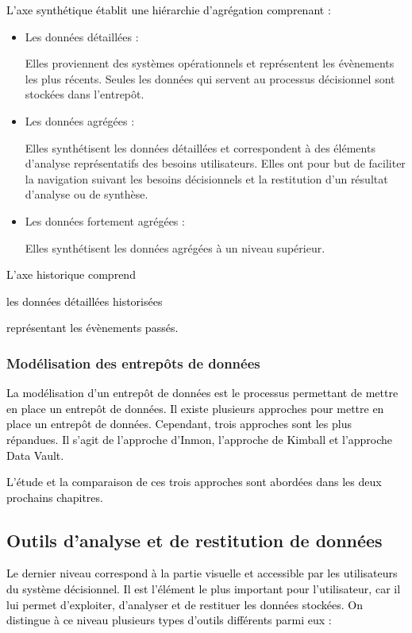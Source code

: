 \documentclass[a4paper,12pt]{report}
\begin{document}
\textcolor{black}{L’axe synthétique établit une hiérarchie d’agrégation comprenant \citep{inmon2002building} :}


\begin{itemize}
	\item  \begin{bf}Les données détaillées : \end{bf} Elles proviennent des systèmes opérationnels et représentent les évènements les plus récents. Seules les données qui servent au processus décisionnel sont stockées dans l’entrepôt.
	\item  \begin{bf}Les données agrégées : \end{bf}Elles synthétisent les données détaillées et correspondent à des éléments d’analyse représentatifs des besoins utilisateurs. Elles ont pour but de faciliter la navigation suivant les besoins décisionnels et la restitution d’un résultat d’analyse ou de synthèse.
	\item  \begin{bf}Les données fortement agrégées : \end{bf}Elles synthétisent les données agrégées à un niveau supérieur.
	\end{itemize}


\textcolor{black}{L’axe historique comprend \begin{bf} les données détaillées historisées \end{bf}représentant les évènements passés.}

\subsubsection{Modélisation des entrepôts de données}
\textcolor{black}{La modélisation d’un entrepôt de données est le processus permettant de mettre en place un entrepôt de données. Il existe plusieurs approches pour mettre en place un entrepôt de données. Cependant, trois approches sont les plus répandues. Il s’agit de l’approche d’Inmon, l’approche de Kimball et l’approche Data Vault.}

\textcolor{black}{L’étude et la comparaison de ces trois approches sont abordées dans les deux prochains chapitres.}

\subsection{Outils d’analyse et de restitution de données}
\textcolor{black}{Le dernier niveau correspond à la partie visuelle et accessible par les utilisateurs du système décisionnel. Il est l’élément le plus important pour l’utilisateur, car il lui permet d’exploiter, d’analyser et de restituer les données stockées. On distingue à ce niveau plusieurs types d’outils différents parmi eux :}
\end{document}

